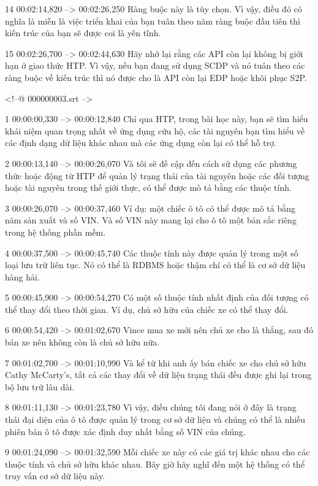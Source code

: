 14
00:02:14,820 --> 00:02:26,250
Ràng buộc này là tùy chọn.  Vì vậy, điều đó có nghĩa là miễn là việc triển khai của bạn tuân theo năm ràng buộc đầu tiên thì kiến ​​trúc của bạn sẽ được coi là yên tĩnh.

15
00:02:26,700 --> 00:02:44,630
Hãy nhớ lại rằng các API còn lại không bị giới hạn ở giao thức HTP.  Vì vậy, nếu bạn đang sử dụng SCDP và nó tuân theo các ràng buộc về kiến ​​​​trúc thì nó được cho là API còn lại EDP hoặc khôi phục S2P.

<!--@ 000000003.srt -->

1
00:00:00,330 --> 00:00:12,840
Chỉ qua HTP, trong bài học này, bạn sẽ tìm hiểu khái niệm quan trọng nhất về ứng dụng cứu hộ, các tài nguyên bạn tìm hiểu về các định dạng dữ liệu khác nhau mà các ứng dụng còn lại có thể hỗ trợ.

2
00:00:13,140 --> 00:00:26,070
Và tôi sẽ đề cập đến cách sử dụng các phương thức hoặc động từ HTP để quản lý trạng thái của tài nguyên hoặc các đối tượng hoặc tài nguyên trong thế giới thực, có thể được mô tả bằng các thuộc tính.

3
00:00:26,070 --> 00:00:37,460
Ví dụ: một chiếc ô tô có thể được mô tả bằng năm sản xuất và số VIN.  Và số VIN này mang lại cho ô tô một bản sắc riêng trong hệ thống phần mềm.

4
00:00:37,500 --> 00:00:45,740
Các thuộc tính này được quản lý trong một số loại lưu trữ liên tục.  Nó có thể là RDBMS hoặc thậm chí có thể là cơ sở dữ liệu hàng hải.

5
00:00:45,900 --> 00:00:54,270
Có một số thuộc tính nhất định của đối tượng có thể thay đổi theo thời gian.  Ví dụ, chủ sở hữu của chiếc xe có thể thay đổi.

6
00:00:54,420 --> 00:01:02,670
Vince mua xe mới nên chủ xe cho là thắng, sau đó bán xe nên không còn là chủ sở hữu nữa.

7
00:01:02,700 --> 00:01:10,990
Và kể từ khi anh ấy bán chiếc xe cho chủ sở hữu Cathy McCarty's, tất cả các thay đổi về dữ liệu trạng thái đều được ghi lại trong bộ lưu trữ lâu dài.

8
00:01:11,130 --> 00:01:23,780
Vì vậy, điều chúng tôi đang nói ở đây là trạng thái đại diện của ô tô được quản lý trong cơ sở dữ liệu và chúng có thể là nhiều phiên bản ô tô được xác định duy nhất bằng số VIN của chúng.

9
00:01:24,090 --> 00:01:32,590
Mỗi chiếc xe này có các giá trị khác nhau cho các thuộc tính và chủ sở hữu khác nhau.  Bây giờ hãy nghĩ đến một hệ thống có thể truy vấn cơ sở dữ liệu này.


